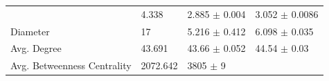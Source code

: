 \documentclass[12pt,twoside]{amherstthesis}
\begin{document}
\begin{longtable}[]{@{}llll@{}}
\begin{minipage}[t]{0.28\columnwidth}
  \end{minipage} & \begin{minipage}[t]{0.11\columnwidth}\raggedright\strut
  4.338\strut
  \end{minipage} & \begin{minipage}[t]{0.24\columnwidth}\raggedright\strut
  2.885 \(\pm\) 0.004\strut
  \end{minipage} & \begin{minipage}[t]{0.26\columnwidth}\raggedright\strut
  3.052 \(\pm\) 0.0086\strut
  \end{minipage}\tabularnewline
  \begin{minipage}[t]{0.28\columnwidth}\raggedright\strut
  Diameter\strut
  \end{minipage} & \begin{minipage}[t]{0.11\columnwidth}\raggedright\strut
  17\strut
  \end{minipage} & \begin{minipage}[t]{0.24\columnwidth}\raggedright\strut
  5.216 \(\pm\) 0.412\strut
  \end{minipage} & \begin{minipage}[t]{0.26\columnwidth}\raggedright\strut
  6.098 \(\pm\) 0.035\strut
  \end{minipage}\tabularnewline
  \begin{minipage}[t]{0.28\columnwidth}\raggedright\strut
  Avg. Degree\strut
  \end{minipage} & \begin{minipage}[t]{0.11\columnwidth}\raggedright\strut
  43.691\strut
  \end{minipage} & \begin{minipage}[t]{0.24\columnwidth}\raggedright\strut
  43.66 \(\pm\) 0.052\strut
  \end{minipage} & \begin{minipage}[t]{0.26\columnwidth}\raggedright\strut
  44.54 \(\pm\) 0.03\strut
  \end{minipage}\tabularnewline
  \begin{minipage}[t]{0.28\columnwidth}\raggedright\strut
  Avg. Betweenness Centrality\strut
  \end{minipage} & \begin{minipage}[t]{0.11\columnwidth}\raggedright\strut
  2072.642\strut
  \end{minipage} & \begin{minipage}[t]{0.24\columnwidth}\raggedright\strut
  3805 \(\pm\) 9\strut
  \end{minipage} & \begin{minipage}[t]{0.26\columnwidth}\raggedright\strut

\end{minipage}
\end{longtable}
\end{document}
